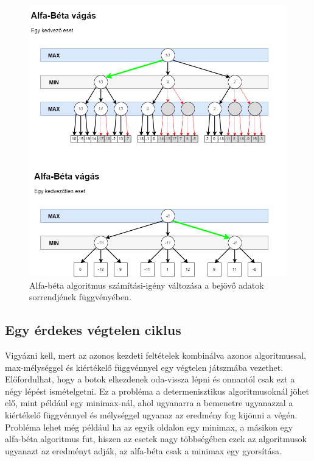 \documentclass[twoside, a4paper, 12pt]{book}
\begin{document}
\begin{figure}[htbp]
	\centering
	\includegraphics[width=\textwidth]{img/alphabeta_examples.png}
	\caption{Alfa-béta algoritmus számítási-igény változása a bejövő adatok sorrendjének függvényében.}
	\label{fig:alphabeta_examples}
\end{figure}

\subsection{Egy érdekes végtelen ciklus}
Vigyázni kell, mert az azonos kezdeti feltételek kombinálva azonos algoritmussal, max-mélységgel és kiértékelő függvénnyel egy végtelen játszmába vezethet. Előfordulhat, hogy a botok elkezdenek oda-vissza lépni és onnantól csak ezt a négy lépést ismételgetni. Ez a probléma a determenisztikus algoritmusoknál jöhet elő, mint például egy minimax-nál, ahol ugyanarra a bemenetre ugyanazzal a kiértékelő függvénnyel és mélységgel ugyanaz az eredmény fog kijönni a végén. Probléma lehet még például ha az egyik oldalon egy minimax, a másikon egy alfa-béta algoritmus fut, hiszen az esetek nagy többségében ezek az algoritmusok ugyanazt az eredményt adják, az alfa-béta csak a minimax egy gyorsítása.
\end{document}
